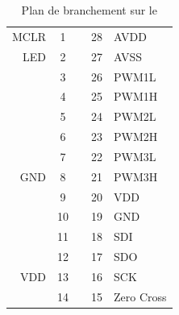 \begin{table}[h]
\begin{multicols}{2}
\begin{center}
			
			\begin{footnotesize}
				\begin{tabular}{r|ccc|l}
				MCLR 	& 1 &    & 28 & AVDD 	\\ 
				LED  	& 2 &    & 27 & AVSS 	\\ 
				  		& 3 &    & 26 & PWM1L	\\
				  		& 4 &    & 25 & PWM1H	\\ 
				  		& 5 &    & 24 & PWM2L	\\ 
				  		& 6 &    & 23 & PWM2H  	\\ 
				 		& 7 &    & 22 & PWM3L  	\\ 
				GND 	& 8 &    & 21 & PWM3H  	\\ 
				  		& 9 &    & 20 & VDD 	\\ 
				  		& 10 &   & 19 & GND 	\\ 
				  		& 11 &   & 18 & SDI 	\\ 
				  		& 12 &   & 17 & SDO 	\\ 
				VDD 	& 13 &   & 16 & SCK 	\\ 
				  		& 14 &   & 15 & Zero Cross\\ 
				\end{tabular} 
			\end{footnotesize}
			\caption{Plan de branchement sur le \dspic}
			\label{pinoutdspic}
			\end{center}
			\end{multicols}
		\end{table}

